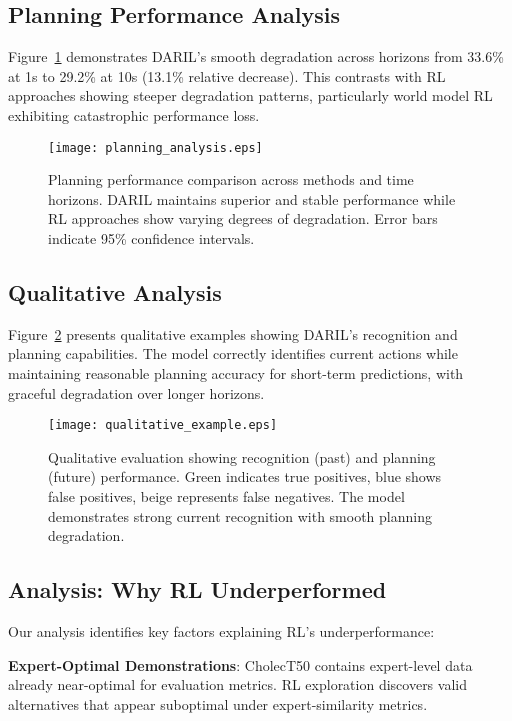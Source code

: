 \documentclass[runningheads]{llncs}
\begin{document}
\subsection{Planning Performance Analysis}

Figure~\ref{fig:planning_analysis} demonstrates DARIL's smooth degradation across horizons from 33.6\% at 1s to 29.2\% at 10s (13.1\% relative decrease). This contrasts with RL approaches showing steeper degradation patterns, particularly world model RL exhibiting catastrophic performance loss.

\begin{figure}[h]
\centering
\texttt{[image: planning\_analysis.eps]}
\caption{Planning performance comparison across methods and time horizons. DARIL maintains superior and stable performance while RL approaches show varying degrees of degradation. Error bars indicate 95\% confidence intervals.}
\label{fig:planning_analysis}
\end{figure}

\subsection{Qualitative Analysis}

Figure~\ref{fig:qualitative} presents qualitative examples showing DARIL's recognition and planning capabilities. The model correctly identifies current actions while maintaining reasonable planning accuracy for short-term predictions, with graceful degradation over longer horizons.

\begin{figure}[h]
\centering
\texttt{[image: qualitative\_example.eps]}
\caption{Qualitative evaluation showing recognition (past) and planning (future) performance. Green indicates true positives, blue shows false positives, beige represents false negatives. The model demonstrates strong current recognition with smooth planning degradation.}
\label{fig:qualitative}
\end{figure}

\subsection{Analysis: Why RL Underperformed}

Our analysis identifies key factors explaining RL's underperformance:

\textbf{Expert-Optimal Demonstrations}: CholecT50 contains expert-level data already near-optimal for evaluation metrics. RL exploration discovers valid alternatives that appear suboptimal under expert-similarity metrics.
\end{document}
